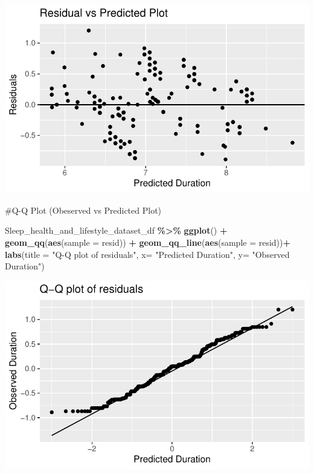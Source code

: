 \documentclass[
  11pt,
]{article}
\newenvironment{Shaded}{\begin{snugshade}}{\end{snugshade}}
\newcommand{\AttributeTok}[1]{\textcolor[rgb]{0.13,0.29,0.53}{#1}}
\newcommand{\FunctionTok}[1]{\textcolor[rgb]{0.13,0.29,0.53}{\textbf{#1}}}
\newcommand{\NormalTok}[1]{#1}
\newcommand{\SpecialCharTok}[1]{\textcolor[rgb]{0.81,0.36,0.00}{\textbf{#1}}}
\newcommand{\StringTok}[1]{\textcolor[rgb]{0.31,0.60,0.02}{#1}}
\begin{document}
\begin{center}\includegraphics[width=0.7\linewidth]{SleepHelath_files/figure-latex/unnamed-chunk-60-1} \end{center}

\#Q-Q Plot (Obeserved vs Predicted Plot)

\begin{Shaded}
\begin{Highlighting}[]
\NormalTok{Sleep\_health\_and\_lifestyle\_dataset\_df }\SpecialCharTok{\%\textgreater{}\%}
  \FunctionTok{ggplot}\NormalTok{() }\SpecialCharTok{+}
  \FunctionTok{geom\_qq}\NormalTok{(}\FunctionTok{aes}\NormalTok{(}\AttributeTok{sample =}\NormalTok{ resid)) }\SpecialCharTok{+}
  \FunctionTok{geom\_qq\_line}\NormalTok{(}\FunctionTok{aes}\NormalTok{(}\AttributeTok{sample =}\NormalTok{ resid))}\SpecialCharTok{+}
  \FunctionTok{labs}\NormalTok{(}\AttributeTok{title =} \StringTok{"Q{-}Q plot of residuals"}\NormalTok{, }\AttributeTok{x=} \StringTok{"Predicted Duration"}\NormalTok{, }\AttributeTok{y=} \StringTok{"Observed Duration"}\NormalTok{)}
\end{Highlighting}
\end{Shaded}

\begin{center}\includegraphics[width=0.7\linewidth]{SleepHelath_files/figure-latex/unnamed-chunk-61-1} \end{center}
\end{document}
